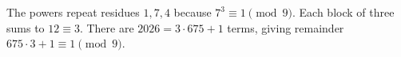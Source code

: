 The powers repeat residues $1,7,4$ because $7^3\equiv 1\pmod 9$. Each block of three sums to $12\equiv 3$. There are $2026=3\cdot 675+1$ terms, giving remainder $675\cdot 3+1\equiv\boxed 1\pmod 9$.
